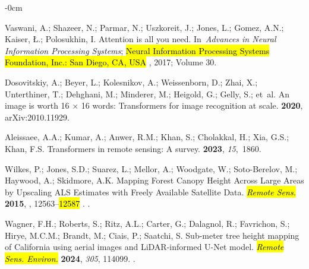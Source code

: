 \documentclass[remotesensing,article,accept,pdftex,moreauthors]{Definitions/mdpi}
\begin{document}
\begin{adjustwidth}{-\extralength}{0cm}
\begin{thebibliography}{999}
Vaswani, A.; Shazeer, N.; Parmar, N.; Uszkoreit, J.; Jones, L.; Gomez, A.N.;
  Kaiser, {\L}.; Polosukhin, I.
\newblock Attention is all you need.
\newblock In~{\em Advances in Neural Information Processing Systems}; \hl{Neural Information Processing Systems Foundation, Inc.: San Diego, CA, USA}%
, 2017; Volume 30.

Dosovitskiy, A.; Beyer, L.; Kolesnikov, A.; Weissenborn, D.; Zhai, X.;
  Unterthiner, T.; Dehghani, M.; Minderer, M.; Heigold, G.; Gelly, S.;  et~al.
\newblock An image is worth 16 $\times$ 16 words: Transformers for image recognition at
  scale.
 {\bf 2020}, arXiv:2010.11929.

Aleissaee, A.A.; Kumar, A.; Anwer, R.M.; Khan, S.; Cholakkal, H.; Xia, G.S.;
  Khan, F.S.
\newblock Transformers in remote sensing: A survey.
 {\bf 2023}, {\em 15},~1860.

Wilkes, P.; Jones, S.D.; Suarez, L.; Mellor, A.; Woodgate, W.; Soto-Berelov,
  M.; Haywood, A.; Skidmore, A.K.
\newblock Mapping Forest Canopy Height Across Large Areas by Upscaling {ALS}
  Estimates with Freely Available Satellite Data. \emph{\hl{Remote Sens.}%
} {\bf 2015},
, 12563--\hl{12587}%
.
.

Wagner, F.H.; Roberts, S.; Ritz, A.L.; Carter, G.; Dalagnol, R.; Favrichon, S.;
  Hirye, M.C.M.; Brandt, M.; Ciais, P.; Saatchi, S.
\newblock Sub-meter tree height mapping of California using aerial images and
  {LiDAR}-informed U-Net model. \emph{\hl{Remote Sens. Environ.}} {\bf 2024}, {\em 305}, 114099.
.


\end{thebibliography}
\end{adjustwidth}
\end{document}

